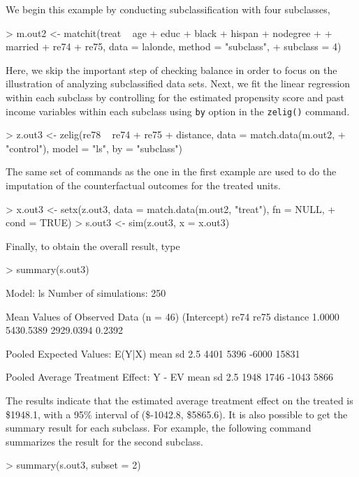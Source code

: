 \begin{enumerate}
  We begin this example by conducting subclassification with four subclasses,
\begin{Schunk}
\begin{Sinput}
> m.out2 <- matchit(treat ~ age + educ + black + hispan + nodegree + 
+     married + re74 + re75, data = lalonde, method = "subclass", 
+     subclass = 4)
\end{Sinput}
\end{Schunk}
Here, we skip the important step of checking balance in order to focus
on the illustration of analyzing subclassified data sets.  Next, we
fit the linear regression within each subclass by controlling for the
estimated propensity score and past income variables within each
subclass using {\tt by} option in the {\tt zelig()} command. 
\begin{Schunk}
\begin{Sinput}
> z.out3 <- zelig(re78 ~ re74 + re75 + distance, data = match.data(m.out2, 
+     "control"), model = "ls", by = "subclass")
\end{Sinput}
\end{Schunk}
The same set of commands as the one in the first example are used to
do the imputation of the counterfactual outcomes for the treated
units.
\begin{Schunk}
\begin{Sinput}
> x.out3 <- setx(z.out3, data = match.data(m.out2, "treat"), fn = NULL, 
+     cond = TRUE)
> s.out3 <- sim(z.out3, x = x.out3)
\end{Sinput}
\end{Schunk}
Finally, to obtain the overall result, type
\begin{Schunk}
\begin{Sinput}
> summary(s.out3)
\end{Sinput}
\begin{Soutput}

  Model: ls 
  Number of simulations: 250 

Mean Values of Observed Data (n = 46) 
(Intercept)        re74        re75    distance 
     1.0000   5430.5389   2929.0394      0.2392 

Pooled Expected Values: E(Y|X)
 mean    sd  2.5% 97.5% 
 4401  5396 -6000 15831 

Pooled Average Treatment Effect: Y - EV
 mean    sd  2.5% 97.5% 
 1948  1746 -1043  5866 

\end{Soutput}
\end{Schunk}
The results indicate that the estimated average treatment effect on
the treated is
\$1948.1,
with a 95\% interval of
(\$-1042.8,
\$5865.6).
It is also possible to get the summary result for each subclass. For
example, the following command summarizes the result for the second
subclass.
\begin{Schunk}
\begin{Sinput}
> summary(s.out3, subset = 2)
\end{Sinput}
\begin{Soutput}


\end{Soutput}
\end{Schunk}
\end{enumerate}
